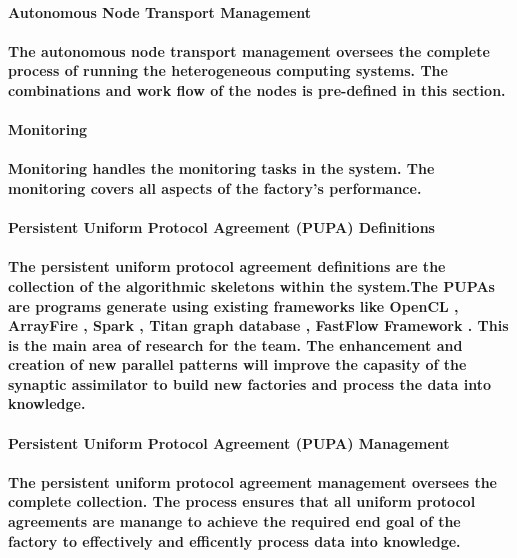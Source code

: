 \documentclass{acm_proc_article-sp}
\begin{document}
\paragraph{\textbf{Autonomous Node Transport Management}}
\paragraph{The autonomous node transport management oversees the complete process of running the heterogeneous computing systems. The combinations and work flow of the nodes is pre-defined in this section.}
\paragraph{\textbf{Monitoring}}
\paragraph{Monitoring handles the monitoring tasks in the system. The monitoring covers all aspects of the factory's performance.}
\paragraph{\textbf{Persistent Uniform Protocol Agreement (PUPA) Definitions}}
\paragraph{The persistent uniform protocol agreement definitions are the collection of the algorithmic skeletons within the system.The PUPAs are programs generate using existing frameworks like OpenCL \cite{stone2010opencl}, ArrayFire \cite{malcolm2012arrayfire}, Spark \cite{hintjens2011omq}, Titan graph database \cite{tanase2014highly} \cite{mishra2014titan}, FastFlow Framework \cite{aldinucci2011accelerating}. This is the main area of research for the team. The enhancement and creation of new parallel patterns will improve the capasity of the synaptic assimilator to build new factories and process the data into knowledge.}
\paragraph{\textbf{Persistent Uniform Protocol Agreement (PUPA) Management}}
\paragraph{The persistent uniform protocol agreement management oversees the complete collection. The process ensures that all uniform protocol agreements are manange to achieve the required end goal of the factory to effectively and efficently process data into knowledge.}
\end{document}
